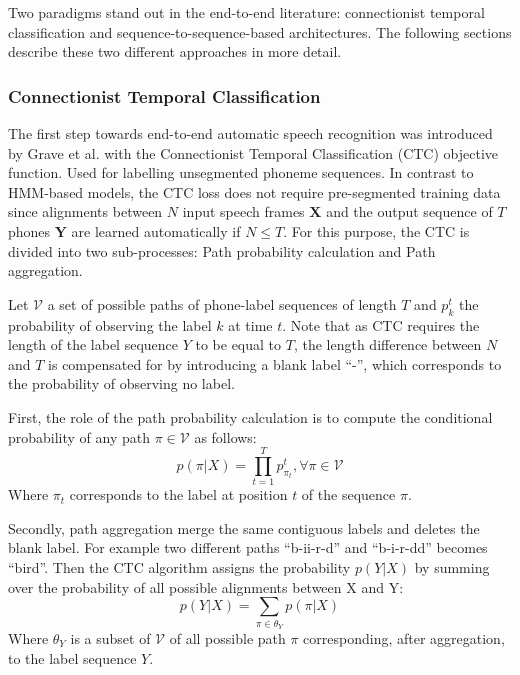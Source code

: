 Two paradigms stand out in the end-to-end literature: connectionist temporal classification and sequence-to-sequence-based architectures. The following sections describe these two different approaches in more detail.
 
 \subsubsection{Connectionist Temporal Classification}
 The first step towards end-to-end automatic speech recognition was introduced by Grave et al. \cite{First_End2End} with the Connectionist Temporal Classification (CTC) objective function. Used for labelling unsegmented phoneme sequences. In contrast to HMM-based models, the CTC loss does not require pre-segmented training data since alignments between $N$ input speech frames $\boldsymbol{X}$ and the output sequence of $T$ phones $\boldsymbol{Y}$ are learned automatically if $N \leq T$. For this purpose, the CTC is divided into two sub-processes: Path probability calculation and Path aggregation.
 
Let $\mathcal{V}$  a set of possible paths of phone-label sequences of length $T$ and  $p^t_k$ the probability of observing the label $k$ at time $t$. Note that as CTC requires the length of the label sequence $Y$ to be equal to $T$, the length difference between $N$ and $T$ is compensated for by introducing a blank label ``-'', which corresponds to the probability of observing no label. 

First, the role of the path probability calculation is to compute the conditional probability of any path $\pi \in \mathcal{V}$ as follows:
  \begin{equation}
     p(\pi|X) = \prod_{t=1}^{T}p_{\pi_t}^{t} , \forall \pi \in \mathcal{V}
 \end{equation}
 Where $\pi_t$ corresponds to the label at position $t$ of the sequence $\pi$.

 Secondly, path aggregation merge the same contiguous labels and deletes the blank label. For example two different paths ``b-ii-r-d'' and ``b-i-r-dd'' becomes ``bird''. Then the CTC algorithm assigns the probability $p(Y|X)$ by summing over the probability of all possible alignments between X and Y:
 \begin{equation}
     p(Y|X) = \sum_{\pi \in \theta_Y}p(\pi|X)
 \end{equation}
 Where $\theta_Y$ is a subset of $\mathcal{V}$ of all possible path $\pi$ corresponding, after aggregation, to the label sequence $Y$.
